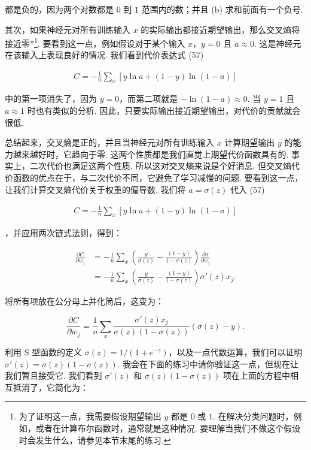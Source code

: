 \noindent 都是负的，因为两个对数都是 $0$ 到 $1$ 范围内的数；并且 (b) 求和前面有一个负号.

其次，如果神经元对所有训练输入 $x$ 的实际输出都接近期望输出，那么交叉熵将接近零*\footnote{为了证明这一点，我需要假设期望输出 $y$ 都是 $0$ 或 $1$. 在解决分类问题时，例如，或者在计算布尔函数时，通常就是这种情况. 要理解当我们不做这个假设时会发生什么，请参见本节末尾的练习.}. 要看到这一点，例如假设对于某个输入 $x$，$y = 0$ 且 $a \approx 0$. 这是神经元在该输入上表现良好的情况. 我们看到代价表达式 (57)

\begin{align*}
C = -\frac{1}{n} \sum_x \left[y \ln a + (1-y ) \ln (1-a) \right] \nonumber
\end{align*}

\noindent 中的第一项消失了，因为 $y = 0$，而第二项就是 $-\ln (1-a) \approx 0$. 当 $y = 1$ 且 $a \approx 1$ 时也有类似的分析. 因此，只要实际输出接近期望输出，对代价的贡献就会很低.

总结起来，交叉熵是正的，并且当神经元对所有训练输入 $x$ 计算期望输出 $y$ 的能力越来越好时，它趋向于零. 这两个性质都是我们直觉上期望代价函数具有的. 事实上，二次代价也满足这两个性质. 所以这对交叉熵来说是个好消息. 但交叉熵代价函数的优点在于，与二次代价不同，它避免了学习减慢的问题. 要看到这一点，让我们计算交叉熵代价关于权重的偏导数. 我们将 $a = \sigma(z)$ 代入 (57)

\begin{align*}
C = -\frac{1}{n} \sum_x \left[y \ln a + (1-y ) \ln (1-a) \right] \nonumber
\end{align*}

\noindent，并应用两次链式法则，得到：

\begin{align}
\frac{\partial C}{\partial w_j} &= -\frac{1}{n} \sum_x \left( \frac{y }{\sigma(z)} -\frac{(1-y)}{1-\sigma(z)} \right) \frac{\partial \sigma}{\partial w_j} \tag{58} \\ &= -\frac{1}{n} \sum_x \left( \frac{y}{\sigma(z)} -\frac{(1-y)}{1-\sigma(z)} \right)\sigma'(z) x_j. \tag{59}
\end{align}

\noindent 将所有项放在公分母上并化简后，这变为：

\begin{equation}
\frac{\partial C}{\partial w_j} = \frac{1}{n} \sum_x \frac{\sigma'(z) x_j}{\sigma(z) (1-\sigma(z))} (\sigma(z)-y).
\tag{60}
\end{equation}

\noindent 利用 S 型函数的定义 $\sigma(z) = 1/(1+e^{-z})$，以及一点代数运算，我们可以证明 $\sigma'(z) = \sigma(z)(1-\sigma(z))$. 我会在下面的练习中请你验证这一点，但现在让我们暂且接受它. 我们看到 $\sigma'(z)$ 和 $\sigma(z)(1-\sigma(z))$ 项在上面的方程中相互抵消了，它简化为：

